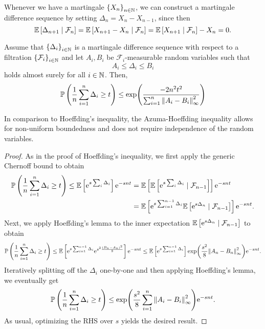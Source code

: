 Whenever we have a martingale $\left\{X_n\right\}_{n\in\mathbb{N}}$, we can construct a martingale difference sequence by setting $\Delta_n = X_n - X_{n-1}$, since then
\[
    \mathbb{E}\left[\Delta_{n+1} \mathrel{|} \mathcal{F}_n\right] = \mathbb{E}\left[X_{n+1} - X_n \mathrel{|} \mathcal{F}_n\right] = \mathbb{E}\left[X_{n+1} \mathrel{|} \mathcal{F}_n\right] - X_n = 0.
\]

\begin{theorem}
\label{thm: azuma-hoeffding}
Assume that $\left\{\Delta_i\right\}_{i\in\mathbb{N}}$ is a martingale difference sequence with respect to a filtration $\left\{\mathcal{F}_i\right\}_{i\in\mathbb{N}}$ and let $A_i, B_i$ be $\mathcal{F}_i$-measurable random variables such that
\[
    A_i \leq \Delta_i \leq B_i
\]
holds almost surely for all $i \in \mathbb{N}$. Then,
\[
    \mathbb{P}\left(\frac{1}{n}\sum_{i=1}^n \Delta_i \geq t\right) \leq \exp(\frac{-2n^2t^2}{\sum_{i=1}^n \norm{A_i - B_i}_\infty^2})
\]
\end{theorem}

In comparison to Hoeffding’s inequality, the Azuma-Hoeffding inequality allows for non-uniform boundedness and does not require independence of the random variables.

\begin{proof}
As in the proof of Hoeffding's inequality, we first apply the generic Chernoff bound to obtain
\begin{align*}
    \mathbb{P}\left(\frac{1}{n}\sum_{i=1}^n \Delta_i \geq t\right) \leq \mathbb{E}\left[\mathrm{e}^{s\sum_i \Delta_i}\right] \mathrm{e}^{-snt} &= \mathbb{E}\left[\mathbb{E}\left[\mathrm{e}^{s\sum_i \Delta_i} \mathrel{|} \mathcal{F}_{n-1}\right]\right] \mathrm{e}^{-snt} \\
        &= \mathbb{E}\left[\mathrm{e}^{s\sum_{i=1}^{n-1} \Delta_i} \mathbb{E}\left[\mathrm{e}^{s\Delta_n} \mathrel{|} \mathcal{F}_{n-1}\right]\right] \mathrm{e}^{-snt}.
\end{align*}
Next, we apply Hoeffding's lemma to the inner expectation $\mathbb{E}\left[\mathrm{e}^{s\Delta_n} \mathrel{|} \mathcal{F}_{n-1}\right]$ to obtain
\[
    \mathbb{P}\left(\frac{1}{n}\sum_{i=1}^n \Delta_i \geq t\right) \leq \mathbb{E}\left[\mathrm{e}^{s\sum_{i=1}^{n-1} \Delta_i} \mathrm{e}^{s^2\frac{(B_n - A_n)^2}{8}}\right] \mathrm{e}^{-snt} \leq \mathbb{E}\left[\mathrm{e}^{s\sum_{i=1}^{n-1} \Delta_i}\right] \exp(\frac{s^2}{8}\norm{A_n - B_n}^2_\infty) \mathrm{e}^{-snt}.
\]
Iteratively splitting off the $\Delta_i$ one-by-one and then applying Hoeffding's lemma, we eventually get
\[
    \mathbb{P}\left(\frac{1}{n}\sum_{i=1}^n \Delta_i \geq t\right) \leq \exp(\frac{s^2}{8}\sum_{i=1}^n \norm{A_i - B_i}_\infty^2) \mathrm{e}^{-snt}.
\]
As usual, optimizing the RHS over $s$ yields the desired result.
\end{proof}
